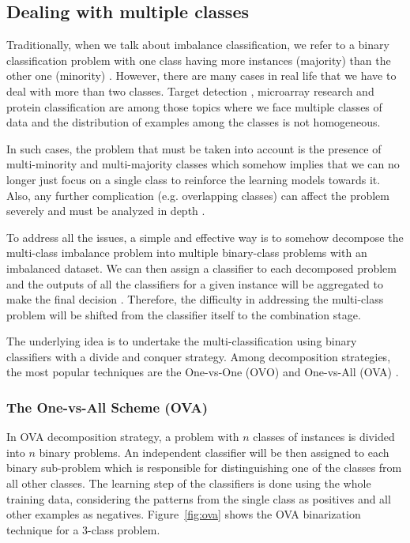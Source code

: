 \subsection{Dealing with multiple classes}

Traditionally, when we talk about imbalance classification, we refer to a binary classification 
problem with one class having more instances (majority) than the other one (minority)
\cite{haibo_he_learning_2009, branco2015survey}. However, there are many cases in real life 
that we have to deal with more than two classes. Target detection \cite{razakarivony2016vehicle},  
microarray research \cite{yu2013recognition} and protein classification \cite{zhao2008protein} 
are among those topics where we face multiple classes of data and the distribution of examples among 
the classes is not homogeneous.
 
In such cases, the problem that must be taken into account is the presence of multi-minority 
and multi-majority classes \cite{wang2016dealing} which somehow implies that we can no 
longer just focus on a single class to reinforce the learning models towards it. Also, 
any further complication (e.g. overlapping classes) can affect the problem severely and must be 
analyzed in depth \cite{saez2016analyzing}.

To address all the issues, a simple and effective way is to somehow decompose the multi-class 
imbalance problem into multiple binary-class problems with an imbalanced dataset. We can 
then assign a classifier to each decomposed problem and the outputs of all the classifiers 
for a given instance will be aggregated to make the final decision \cite{kuncheva2014combining}. 
Therefore, the difficulty in addressing the multi-class problem will be shifted from the classifier 
itself to the combination stage. 

The underlying idea is to undertake the multi-classification using binary classifiers 
with a divide and conquer strategy. Among decomposition strategies, the most popular 
techniques are the One-vs-One (OVO) \cite{hastie1998classification,knerr1990single}
and One-vs-All (OVA) \cite{clark1991rule,anand1995efficient}.

\subsubsection{The One-vs-All Scheme (OVA)}
In OVA decomposition strategy, a problem with $n$ classes of instances is divided into $n$ 
binary problems. An independent classifier will be then assigned to each binary sub-problem which 
is responsible for distinguishing one of the classes from all other classes. The learning 
step of the classifiers is done using the whole training data, considering the patterns from 
the single class as positives and all other examples as negatives. Figure~\ref{fig:ova} shows the OVA 
binarization technique for a 3-class problem.

